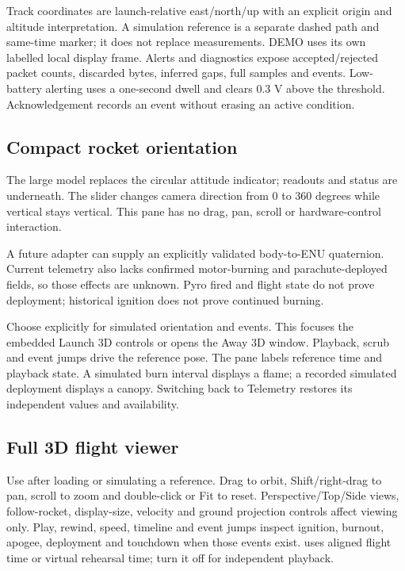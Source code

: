 Track coordinates are launch-relative east/north/up with an explicit origin
and altitude interpretation. A simulation reference is a separate dashed path
and same-time marker; it does not replace measurements. DEMO uses its own
labelled local display frame. Alerts and diagnostics expose accepted/rejected
packet counts, discarded bytes, inferred gaps, full samples and events.
Low-battery alerting uses a one-second dwell and clears 0.3 V above the
threshold. Acknowledgement records an event without erasing an active condition.

\subsection{Compact rocket orientation}
The large model replaces the circular attitude indicator; readouts and status
are underneath. The  slider changes camera direction from
0 to 360 degrees while vertical stays vertical. This pane has no drag, pan,
scroll or hardware-control interaction.


A future adapter can supply an explicitly validated body-to-ENU quaternion.
Current telemetry also lacks confirmed motor-burning and parachute-deployed
fields, so those effects are unknown. Pyro fired and flight state do not prove
deployment; historical ignition does not prove continued burning.

Choose  explicitly for simulated orientation and
events. This focuses the embedded Launch 3D controls or opens the Away 3D
window. Playback, scrub and event jumps drive the reference pose. The pane
labels reference time and playback state. A simulated burn interval displays a
flame; a recorded simulated deployment displays a canopy. Switching back to
Telemetry restores its independent values and availability.


\subsection{Full 3D flight viewer}
Use  after loading or simulating a reference. Drag to
orbit, Shift/right-drag to pan, scroll to zoom and double-click or Fit to reset.
Perspective/Top/Side views, follow-rocket, display-size, velocity and ground
projection controls affect viewing only. Play, rewind, speed, timeline and
event jumps inspect ignition, burnout, apogee, deployment and touchdown when
those events exist.  uses aligned flight time or
virtual rehearsal time; turn it off for independent playback.

